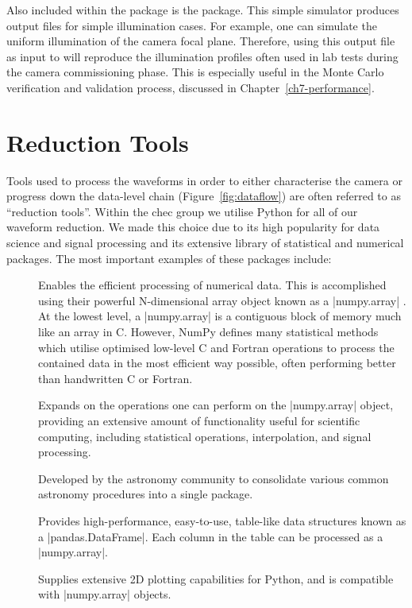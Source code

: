 Also included within the  package is the  package. This simple simulator produces  output files for simple illumination cases. For example, one can simulate the uniform illumination of the camera focal plane. Therefore, using this  output file as input to  will reproduce the illumination profiles often used in lab tests during the camera commissioning phase. This is especially useful in the Monte Carlo verification and validation process, discussed in Chapter~\ref{ch7-performance}.


\section{Reduction Tools}
\lstset{language=C++}

Tools used to process the waveforms in order to either characterise the camera or progress down the data-level chain (Figure~\ref{fig:dataflow}) are often referred to as ``reduction tools''. Within the \gls{chec} group we utilise Python for all of our waveform reduction. We made this choice due to its high popularity for data science and signal processing and its extensive library of statistical and numerical packages. The most important examples of these packages include:

\begin{description}
\item []  Enables the efficient processing of numerical data. This is accomplished using their powerful N-dimensional array object known as a |numpy.array| \cite{VanderWalt2011}. At the lowest level, a |numpy.array| is a contiguous block of memory much like an array in C. However, NumPy defines many statistical methods which utilise optimised low-level C and Fortran operations to process the contained data in the most efficient way possible, often performing better than handwritten C or Fortran.
\item []  Expands on the operations one can perform on the |numpy.array| object, providing an extensive amount of functionality useful for scientific computing, including statistical operations, interpolation, and signal processing.
\item []  Developed by the astronomy community to consolidate various common astronomy procedures into a single package. 
\item []  Provides high-performance, easy-to-use, table-like data structures known as a |pandas.DataFrame|. Each column in the table can be processed as a |numpy.array|.
\item []  Supplies extensive 2D plotting capabilities for Python, and is compatible with |numpy.array| objects.
\end{description}

